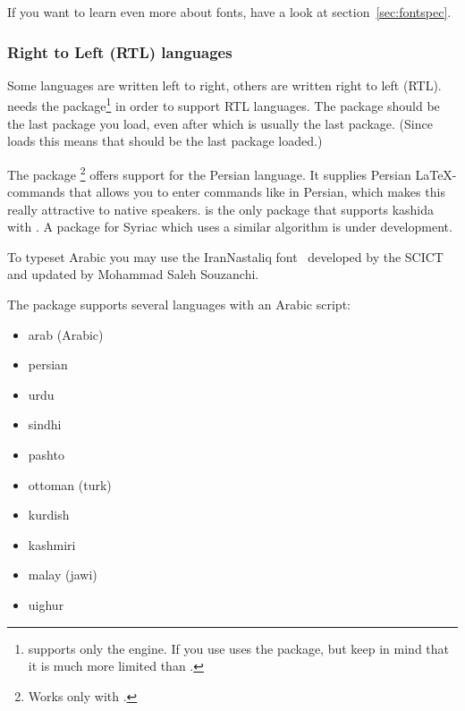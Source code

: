 If you want to learn even more about fonts, have a look at
section~\ref{sec:fontspec}.

\subsubsection{Right to Left (RTL) languages}

Some languages are written left to right, others are written right to left
(RTL).  needs the  package\footnote{
supports only the  engine. If you use 
 uses the  package, but keep in mind that it is
much more limited than .} in order to support RTL languages. The
 package should be the last package you load, even after
 which is usually the last package. (Since 
loads  this means that  should be the last package
loaded.)


The package \footnote{Works only with
.} offers support for the Persian language. It
supplies Persian \LaTeX-commands that allows you to enter commands like
 in Persian, which makes this really attractive to native speakers.
 is the only package that supports kashida with
. A package for Syriac which uses a similar algorithm is under
development.

To typeset Arabic you may use the IranNastaliq font~\cite{font:IranNastaliq}
developed by the SCICT and updated by Mohammad Saleh Souzanchi.

The  package supports several languages with
an Arabic script:
\begin{itemize}
\item arab (Arabic)
\item persian
\item urdu
\item sindhi
\item pashto
\item ottoman (turk)
\item kurdish
\item kashmiri
\item malay (jawi)
\item uighur
\end{itemize}

